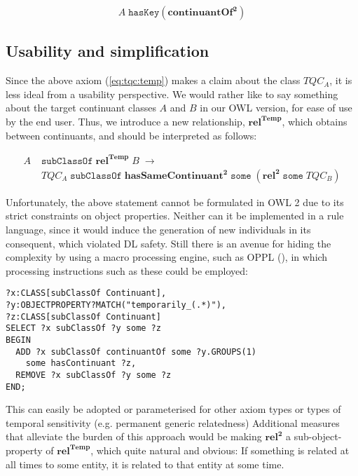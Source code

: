 \documentclass{ao2e}
\newcommand{\mirel}[1]{\ensuremath{\mathrm{\mathbf{#1}}}}
\newcommand{\mclass}[1]{\ensuremath{\mathit{#1}}}
\newcommand{\mrel}[2]{\mirel{#1^#2}}
\newcommand{\mrelb}[1]{\mrel{#1}{2}}
\newcommand{\TQC}[1]{\ensuremath{TQC_{\mclass{#1}}}}
\newcommand{\mreltemp}[1]{\mrel{#1}{{Temp}}}
\begin{document}
\begin{equation}
\mclass{A}\;\mathtt{hasKey}(\mrelb{continuantOf})
\end{equation}

\subsection{Usability and simplification}
Since the above axiom (\ref{eq:tqc:temp}) makes a claim about the class \TQC{A},
it is less ideal from a usability perspective. We would rather like to say
something about the target continuant classes \mclass{A} and \mclass{B} in our OWL version, for
ease of use by the end user. Thus, we introduce a new relationship,
\mreltemp{rel}, which obtains between continuants, and should be interpreted as follows:


\begin{equation}
\begin{split}
\mclass{A}\;&\mathtt{subClassOf}\;\mreltemp{rel}\;\mclass{B}\;\rightarrow\\
&\TQC{A}\;\mathtt{subClassOf}\;\mrelb{hasSameContinuant}\;\mathtt{some}\;(\mrelb{rel}\;\mathtt{some}\;
\TQC{B}) 
\end{split}
\end{equation}

Unfortunately, the above statement cannot be formulated in OWL 2 due to its
strict constraints on object properties. Neither can it be implemented in a
rule language, since it would induce the generation of new individuals in its
consequent, which violated DL safety. Still there is an avenue for hiding the
complexity by using a macro processing engine, such as OPPL (\cite{OPPL}), in
which processing instructions such as these could be employed:

\begin{lstlisting}
?x:CLASS[subClassOf Continuant],
?y:OBJECTPROPERTY?MATCH("temporarily_(.*)"),
?z:CLASS[subClassOf Continuant]
SELECT ?x subClassOf ?y some ?z
BEGIN
  ADD ?x subClassOf continuantOf some ?y.GROUPS(1) 
    some hasContinuant ?z,
  REMOVE ?x subClassOf ?y some ?z
END;
\end{lstlisting}
This can easily be adopted or parameterised for other axiom types or types of temporal
sensitivity (e.g. permanent generic relatedness) Additional measures that alleviate the burden of this approach would be making
\mrelb{rel} a sub-object-property of \mreltemp{rel}, which quite natural and
obvious: If something is related at all times to some entity, it is related to
that entity at some time.
\end{document}
